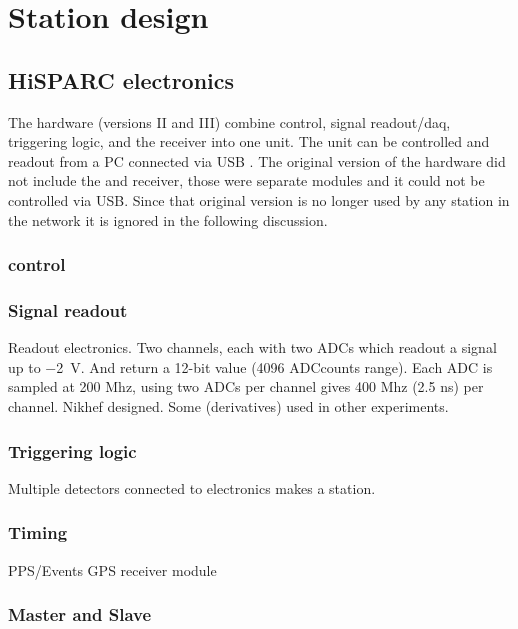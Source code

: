 \section{Station design}

\subsection{HiSPARC electronics}

The \hisparc hardware (versions II and III) combine \pmt control, signal
readout/daq, triggering logic, and the \gps receiver into one unit. The
unit can be controlled and readout from a PC connected via USB
\cite{messages}. The original version of the \hisparc hardware did not
include the \daq and \gps receiver, those were separate modules and it
could not be controlled via USB. Since that original version is no
longer used by any station in the network it is ignored in the following
discussion.


\subsubsection{\pmt control}


\subsubsection{Signal readout}

Readout electronics. Two channels, each with two ADCs which readout a
signal up to \SI{-2}{\volt}. And return a 12-bit value (4096 ADCcounts
range). Each ADC is sampled at 200 Mhz, using two ADCs per channel gives
400 Mhz (2.5 ns) per channel. Nikhef designed. Some (derivatives) used
in other experiments.


\subsubsection{Triggering logic}

Multiple detectors connected to \hisparc electronics makes a station.


\subsubsection{Timing}

PPS/Events
GPS receiver module \cite{trimble}


\subsubsection{Master and Slave}

